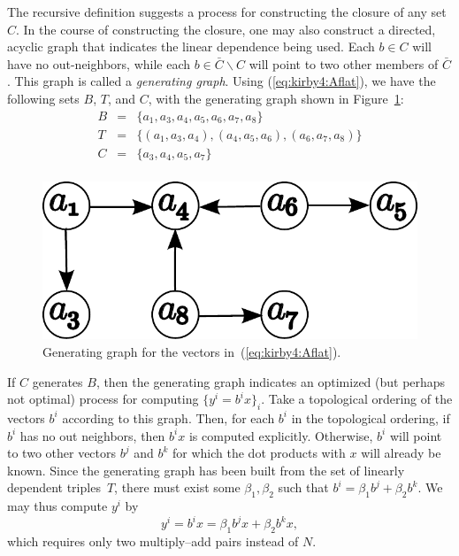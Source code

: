 The recursive definition suggests a process for constructing the
closure of any set \( C \).  In the course of constructing the
closure, one may also construct a directed, acyclic graph that
indicates the linear dependence being used.  Each \( b \in C \) will
have no out-neighbors, while each \( b \in \bar{C} \backslash C \)
will point to two other members of \( \bar{C} \).  This graph is
called a \emph{generating graph}. Using (\ref{eq:kirby4:Aflat}), we
have the following sets $B$, $T$, and $C$, with the generating graph
shown in Figure~\ref{fig:kirby4:gg}:
\begin{displaymath}
\begin{array}{rcl}
 B & = &  \{a_1, a_3, a_4, a_5, a_6, a_7, a_8\} \\
 T & = & \{(a_1, a_3, a_4),(a_4, a_5, a_6), (a_6, a_7, a_8)\} \\
 C & = & \{a_3, a_4, a_5, a_7\} \\
\end{array}
\end{displaymath}

\begin{figure}
  \begin{center}
 \includegraphics[width=\smallwidth]{chapters/kirby-4/pdf/gg2.pdf}
  \caption{Generating graph for the vectors in~(\ref{eq:kirby4:Aflat}).}
  \label{fig:kirby4:gg}
  \end{center}
\end{figure}

If $C$ generates \( B \), then the generating graph indicates an
optimized (but perhaps not optimal) process for computing \( \{ y^i =
b^i x \}_i\).  Take a topological ordering of the vectors \( b^i \)
according to this graph.  Then, for each \( b^i \) in the topological
ordering, if \( b^i \) has no out neighbors, then \( b^i x \) is
computed explicitly.  Otherwise, \( b^i \) will point to two other
vectors \( b^j \) and \( b^k \) for which the dot products with \( x
\) will already be known. Since the generating graph has been built
from the set of linearly dependent triples~$T$, there must exist some
\( \beta_1, \beta_2 \) such that \( b^i = \beta_1 b^j + \beta_2 b^k
\). We may thus compute $y^i$ by
\[
y^i = b^i x = \beta_1 b^j x
+ \beta_2  b^k  x,
\]
which requires only two multiply--add pairs instead of \( N \).

